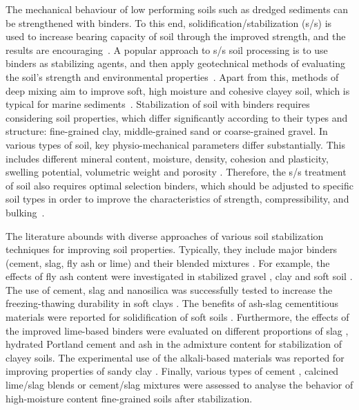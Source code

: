 \documentclass[sustainability,article,accept,pdftex,moreauthors]{Definitions/mdpi}
\begin{document}
The {mechanical} behaviour of low performing soils such as dredged sediments can be strengthened with binders. To this end, solidification/stabilization (s/s) {is used }to increase bearing capacity of soil through {the }improved strength, and the results are \mbox{encouraging~\cite{McLeod,Yongfeng,Rashidi,Zhangetal2011}.} A popular approach to s/s soil processing is to use binders as stabilizing agents, and then apply geotechnical methods of evaluating {the soil's} %
strength and environmental properties~\cite{Rios,ZHANG2022127996}. Apart from this{, }methods of deep mixing {aim} to improve soft, high moisture {and} cohesive clayey soil, which is typical for marine sediments~\cite{Lindh202232,Ye}. Stabilization of soil with binders requires considering soil properties, which {differ} significantly according to {their} types and structure: fine-grained {clay}, middle-grained {sand} or coarse-grained gravel. In various types of soil, key physio-mechanical parameters differ {substantially}. This includes different mineral content, moisture, density, cohesion and plasticity, swelling potential, volumetric weight and porosity \cite{Grubb,Wangetal2018}. Therefore, {the }s/s treatment {of soil }also requires optimal selection binders, {which should be }adjusted to {specific }soil types {in order to improve} the characteristics of strength, compressibility, and \mbox{bulking \cite{Grubbetal2010}.} 

The literature abounds with diverse approaches of various {soil }stabilization techniques for improving {soil} properties{. Typically, they} include major binders (cement, slag, fly ash or lime) and their blended mixtures \cite{Nguyen,Couvidat,Puetal2021}. For example, the effects of fly ash content were investigated in stabilized gravel \cite{Nordmark}, clay \cite{Min} and soft soil \cite{Taj}. The use of cement, slag and nanosilica was successfully tested to increase the freezing-thawing durability in soft clays \cite{Eissa}. The benefits of ash-slag cementitious materials were reported for solidification of soft soils \cite{ShuJing}. {Furthermore, the} effects of {the }improved lime-based binders were evaluated{ on} different proportions of slag \cite{Muthukkumaran}, hydrated Portland cement \cite{app11031080,Lindh202226} and ash \cite{Lietal2019} in the admixture content for stabilization of clayey soils. The experimental use of {the }alkali-based materials was reported for improving properties of sandy clay \cite{CORREASILVA2021106260}. {Finally, }various types of cement \cite{Bazne,Lietal2016}, calcined lime/slag blends \cite{Gu} or cement/slag mixtures \cite{Lindh202222} were assessed to analyse the behavior of high-moisture content fine-grained soils after stabilization. 
\end{document}
